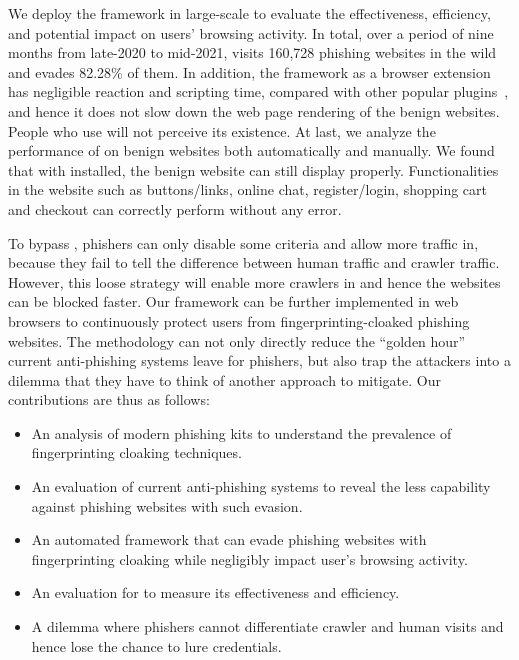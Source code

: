 We deploy the \spartacus framework in large-scale to evaluate the effectiveness, efficiency, and potential impact on users' browsing activity.
In total, over a period of nine months from late-2020 to mid-2021, \spartacus visits 160,728 phishing websites in the wild and evades 82.28\% of them.
In addition, the \spartacus framework as a browser extension has negligible reaction and scripting time, compared with other popular plugins~\cite{exthouse}, and hence it does not slow down the web page rendering of the benign websites.
People who use \spartacus will not perceive its existence.
At last, we analyze the performance of \spartacus on benign websites both automatically and manually.
We found that with \spartacus installed, the benign website can still display properly.
Functionalities in the website such as buttons/links, online chat, register/login, shopping cart and checkout can correctly perform without any error.

To bypass \spartacus, phishers can only disable some criteria and allow more traffic in, because they fail to tell the difference between human traffic and crawler traffic.
However, this loose strategy will enable more crawlers in and hence the websites can be blocked faster.
Our \spartacus framework can be further implemented in web browsers to continuously protect users from fingerprinting-cloaked phishing websites.
The methodology can not only directly reduce the ``golden hour'' current anti-phishing systems leave for phishers,
but also trap the attackers into a dilemma that they have to think of another approach to mitigate.
Our contributions are thus as follows:

\begin{itemize}
    \item An analysis of modern phishing kits to understand the prevalence of fingerprinting cloaking techniques.
    \item An evaluation of current anti-phishing systems to reveal the less capability against phishing websites with such evasion.
    \item An automated framework that can evade phishing websites with fingerprinting cloaking while negligibly impact user's browsing activity.
    \item An evaluation for \spartacus to measure its effectiveness and efficiency.
    \item A dilemma where phishers cannot differentiate crawler and human visits and hence lose the chance to lure credentials.
\end{itemize}
